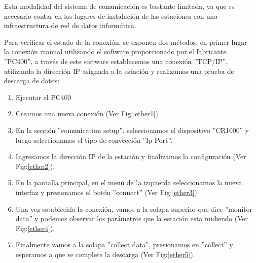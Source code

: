 Esta modalidad del sistema de comunicación es bastante limitada, ya que es necesario contar en los lugares de instalación de las estaciones con una infraestructura de red de datos informática.

Para verificar el estado de la conexión, se exponen dos métodos, en primer lugar la conexión manual utilizando el software proporcionado por el fabricante ''PC400'', a través de este software establecemos una conexión ''TCP/IP'', utilizando la dirección IP asignada a la estación y realizamos una prueba de descarga de datos:

\begin{enumerate}
\item Ejecutar el PC400
\item Creamos una nueva conexión (Ver Fig:\ref{ether1}) 
\item En la sección ''comunication setup'', seleccionamos el dispositivo ''CR1000'' y luego seleccionamos el tipo de convección ''Ip Port''.
\item Ingresamos la dirección IP de la estación y finalizamos la configuración (Ver Fig:\ref{ether2}).
\item En la pantalla principal, en el menú de la izquierda seleccionamos la nueva interfaz y presionamos el botón ''connect'' (Ver Fig:\ref{ether3})
\item Una vez establecida la conexión, vamos a la solapa superior que dice ''monitor data'' y podemos observar los parámetros que la estación esta midiendo (Ver Fig:\ref{ether4}).
\item Finalmente vamos a la solapa ''collect data'', presionamos en ''collect'' y esperamos a que se complete la descarga (Ver Fig:\ref{ether5}).
\end{enumerate}

